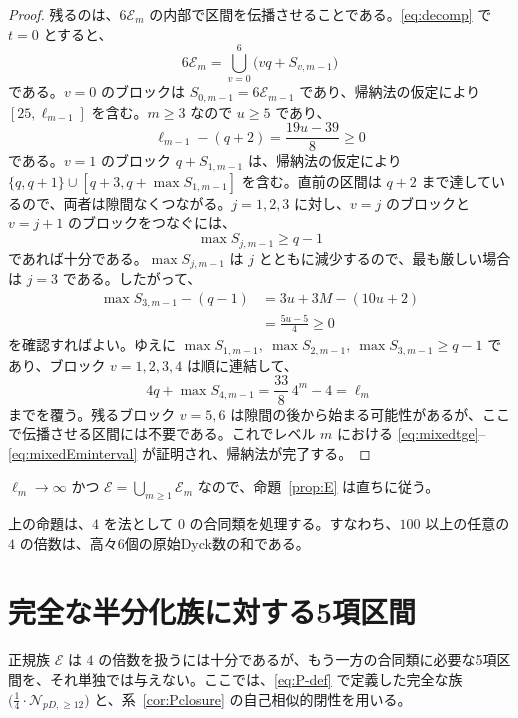 \documentclass[12pt]{ltjsarticle}
\theoremstyle{plain}
\theoremstyle{definition}
\theoremstyle{plain}
\newcommand{\Pset}{
  \bigl(\tfrac{1}{4}\cdot\mathcal{N}_{pD,\geq 12}\bigr)
}
\begin{document}
\begin{proof}
残るのは、$6\mathcal E_m$ の内部で区間を伝播させることである。\eqref{eq:decomp} で $t=0$ とすると、
\[
 6\mathcal E_m=\bigcup_{v=0}^{6}\bigl(vq+S_{v,m-1}\bigr)
\]
である。$v=0$ のブロックは $S_{0,m-1}=6\mathcal E_{m-1}$ であり、帰納法の仮定により $[25,\ell_{m-1}]$ を含む。$m\geq3$ なので $u\geq5$ であり、
\[
 \ell_{m-1}-(q+2)=\frac{19u-39}{8}\geq0
\]
である。$v=1$ のブロック $q+S_{1,m-1}$ は、帰納法の仮定により $\{q,q+1\}\cup[q+3,q+\max S_{1,m-1}]$ を含む。直前の区間は $q+2$ まで達しているので、両者は隙間なくつながる。$j=1,2,3$ に対し、$v=j$ のブロックと $v=j+1$ のブロックをつなぐには、
\[
 \max S_{j,m-1}\geq q-1
\]
であれば十分である。$\max S_{j,m-1}$ は $j$ とともに減少するので、最も厳しい場合は $j=3$ である。したがって、
\[
\begin{aligned}
 \max S_{3,m-1}-(q-1)
 &=3u+3M-(10u+2)\\
 &=\frac{5u-5}{4}\geq0
\end{aligned}
\]
を確認すればよい。ゆえに $\max S_{1,m-1},\ \max S_{2,m-1},\ \max S_{3,m-1}\geq q-1$ であり、ブロック $v=1,2,3,4$ は順に連結して、
\[
 4q+\max S_{4,m-1}=\frac{33}{8}\,4^m-4=\ell_m
\]
までを覆う。残るブロック $v=5,6$ は隙間の後から始まる可能性があるが、ここで伝播させる区間には不要である。これでレベル $m$ における \eqref{eq:mixedtge}--\eqref{eq:mixedEminterval} が証明され、帰納法が完了する。
\end{proof}

$\ell_m\to\infty$ かつ $\mathcal E=\bigcup_{m\geq1}\mathcal E_m$ なので、命題~\ref{prop:E} は直ちに従う。

上の命題は、$4$ を法として $0$ の合同類を処理する。すなわち、$100$ 以上の任意の $4$ の倍数は、高々6個の原始Dyck数の和である。

\section{完全な半分化族に対する5項区間}
\label{sec:five-interval}

正規族 $\mathcal E$ は $4$ の倍数を扱うには十分であるが、もう一方の合同類に必要な5項区間を、それ単独では与えない。ここでは、\eqref{eq:P-def} で定義した完全な族 $\Pset$ と、系~\ref{cor:Pclosure} の自己相似的閉性を用いる。
\end{document}
